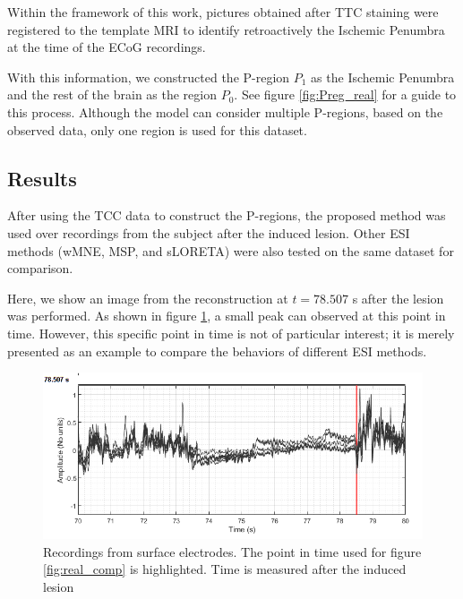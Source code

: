 Within the framework of this work, pictures obtained after TTC staining were registered to the template MRI to identify retroactively the Ischemic Penumbra at the time of the ECoG recordings.
%

With this information, we constructed the P-region $P_1$ as the Ischemic Penumbra and the rest of the brain as the region $P_0$.
%
See figure \ref{fig:Preg_real} for a guide to this process.
%
%
Although the model can consider multiple P-regions, based on the observed data, only one region is used for this dataset.

\subsection{Results}

After using the TCC data to construct the P-regions, the proposed method was used over recordings from the subject after the induced lesion.
%
Other ESI methods (wMNE, MSP, and sLORETA) were also tested on the same dataset for comparison.

Here, we show an image from the reconstruction at $t=78.507$ s after the lesion was performed.
%
As shown in figure \ref{fig:real_ecog}, a small peak can observed at this point in time.
%
However, this specific point in time is not of particular interest; it is merely presented as an example to compare the behaviors of different ESI methods.

\begin{figure}
\centering
\includegraphics[width=0.9\linewidth]{./img_dev2/ECOG_All_sub17diss_diss1}
\caption{Recordings from surface electrodes. The point in time used for figure \ref{fig:real_comp} is highlighted.
Time is measured after the induced lesion}
\label{fig:real_ecog}
\end{figure}

